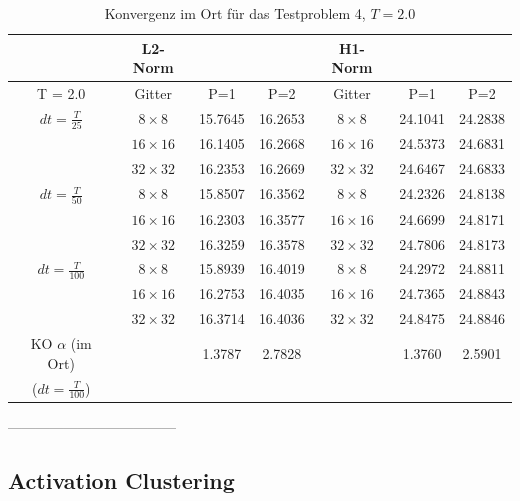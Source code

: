 \documentclass[twoside, 11pt,a4paper]{article}
\numberwithin{equation}{section}
\begin{document}
	\begin{table}[h]
		
		
		\begin{center}
			\begin{tabular}{| c | c c c | c c c |}
				\hline
				& \textbf{L2-Norm} & & & \textbf{H1-Norm} & & \\
				\hline 
				T = 2.0 & Gitter & P=1 & P=2 & Gitter & P=1 & P=2  \\
				
				\hline
				
				$dt = \frac{T}{25}$ &$8 \times 8 $ & 15.7645 & 16.2653 & $8 \times 8 $ & 24.1041 & 24.2838 \\
				& $16\times 16$ & 16.1405 & 16.2668 & $16\times 16$ & 24.5373 & 24.6831 \\
				& $32\times 32$ & 16.2353 & 16.2669 & $32\times 32$ & 24.6467 & 24.6833 \\
				\hline
				
				$dt = \frac{T}{50}$  & $8 \times 8 $ & 15.8507 & 16.3562 & $8 \times 8 $ & 24.2326 & 24.8138 \\
				& $16\times 16$ & 16.2303 & 16.3577 & $16\times 16$ & 24.6699 & 24.8171 \\
				& $32\times 32$ & 16.3259 & 16.3578 & $32\times 32$ & 24.7806 & 24.8173 \\
				\hline
				
				$dt = \frac{T}{100}$  &$8 \times 8 $ & 15.8939 & 16.4019 & $8 \times 8 $ & 24.2972 & 24.8811 \\
				& $16\times 16$ & 16.2753 & 16.4035 & $16\times 16$ & 24.7365 & 24.8843 \\
				& $32\times 32$ & 16.3714 & 16.4036 & $32\times 32$ & 24.8475 & 24.8846 \\
				\hline
				
				KO $\alpha$ (im Ort) & & 1.3787 & 2.7828 & & 1.3760 & 2.5901 \\
				($dt = \frac{T}{100}$) & & & & & & \\
				\hline 
			\end{tabular}
			
			\caption{Konvergenz im Ort für das Testproblem 4, $T=2.0$ }
			\label{errors_testproblem4}
		\end{center}
	\end{table}
	
	------------------------------------
	\subsection{Activation Clustering}
\end{document}
